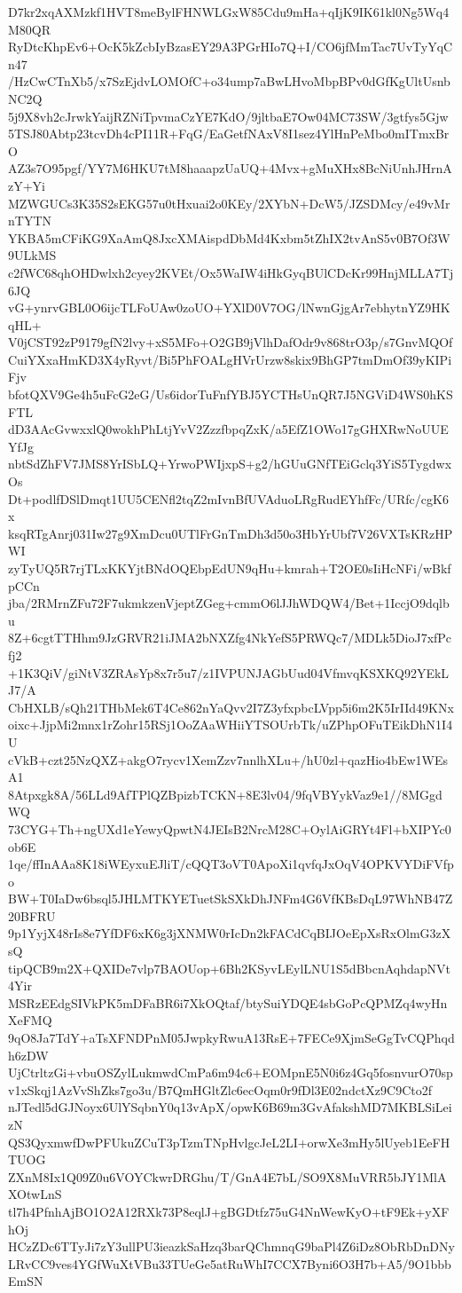 D7kr2xqAXMzkf1HVT8meBylFHNWLGxW85Cdu9mHa+qIjK9IK61kl0Ng5Wq4M80QR
RyDtcKhpEv6+OcK5kZcbIyBzasEY29A3PGrHIo7Q+I/CO6jfMmTac7UvTyYqCn47
/HzCwCTnXb5/x7SzEjdvLOMOfC+o34ump7aBwLHvoMbpBPv0dGfKgUltUsnbNC2Q
5j9X8vh2cJrwkYaijRZNiTpvmaCzYE7KdO/9jltbaE7Ow04MC73SW/3gtfys5Gjw
5TSJ80Abtp23tcvDh4cPI11R+FqG/EaGetfNAxV8I1sez4YlHnPeMbo0mITmxBrO
AZ3s7O95pgf/YY7M6HKU7tM8haaapzUaUQ+4Mvx+gMuXHx8BcNiUnhJHrnAzY+Yi
MZWGUCs3K35S2sEKG57u0tHxuai2o0KEy/2XYbN+DcW5/JZSDMcy/e49vMrnTYTN
YKBA5mCFiKG9XaAmQ8JxcXMAispdDbMd4Kxbm5tZhIX2tvAnS5v0B7Of3W9ULkMS
c2fWC68qhOHDwlxh2cyey2KVEt/Ox5WaIW4iHkGyqBUlCDcKr99HnjMLLA7Tj6JQ
vG+ynrvGBL0O6ijcTLFoUAw0zoUO+YXlD0V7OG/lNwnGjgAr7ebhytnYZ9HKqHL+
V0jCST92zP9179gfN2lvy+xS5MFo+O2GB9jVlhDafOdr9v868trO3p/s7GnvMQOf
CuiYXxaHmKD3X4yRyvt/Bi5PhFOALgHVrUrzw8skix9BhGP7tmDmOf39yKIPiFjv
bfotQXV9Ge4h5uFcG2eG/Us6idorTuFnfYBJ5YCTHsUnQR7J5NGViD4WS0hKSFTL
dD3AAcGvwxxlQ0wokhPhLtjYvV2ZzzfbpqZxK/a5EfZ1OWo17gGHXRwNoUUEYfJg
nbtSdZhFV7JMS8YrISbLQ+YrwoPWIjxpS+g2/hGUuGNfTEiGclq3YiS5TygdwxOs
Dt+podlfDSlDmqt1UU5CENfl2tqZ2mIvnBfUVAduoLRgRudEYhfFc/URfc/cgK6x
ksqRTgAnrj031Iw27g9XmDcu0UTlFrGnTmDh3d50o3HbYrUbf7V26VXTsKRzHPWI
zyTyUQ5R7rjTLxKKYjtBNdOQEbpEdUN9qHu+kmrah+T2OE0sIiHcNFi/wBkfpCCn
jba/2RMrnZFu72F7ukmkzenVjeptZGeg+cmmO6lJJhWDQW4/Bet+1IccjO9dqlbu
8Z+6cgtTTHhm9JzGRVR21iJMA2bNXZfg4NkYefS5PRWQc7/MDLk5DioJ7xfPcfj2
+1K3QiV/giNtV3ZRAsYp8x7r5u7/z1IVPUNJAGbUud04VfmvqKSXKQ92YEkLJ7/A
CbHXLB/sQh21THbMek6T4Ce862nYaQvv2I7Z3yfxpbcLVpp5i6m2K5IrIId49KNx
oixc+JjpMi2mnx1rZohr15RSj1OoZAaWHiiYTSOUrbTk/uZPhpOFuTEikDhN1I4U
cVkB+czt25NzQXZ+akgO7rycv1XemZzv7nnlhXLu+/hU0zl+qazHio4bEw1WEsA1
8Atpxgk8A/56LLd9AfTPlQZBpizbTCKN+8E3lv04/9fqVBYykVaz9e1//8MGgdWQ
73CYG+Th+ngUXd1eYewyQpwtN4JEIsB2NrcM28C+OylAiGRYt4Fl+bXIPYc0ob6E
1qe/ffInAAa8K18iWEyxuEJliT/cQQT3oVT0ApoXi1qvfqJxOqV4OPKVYDiFVfpo
BW+T0IaDw6bsql5JHLMTKYETuetSkSXkDhJNFm4G6VfKBsDqL97WhNB47Z20BFRU
9p1YyjX48rIs8e7YfDF6xK6g3jXNMW0rIcDn2kFACdCqBIJOeEpXsRxOlmG3zXsQ
tipQCB9m2X+QXIDe7vlp7BAOUop+6Bh2KSyvLEylLNU1S5dBbcnAqhdapNVt4Yir
MSRzEEdgSIVkPK5mDFaBR6i7XkOQtaf/btySuiYDQE4sbGoPcQPMZq4wyHnXeFMQ
9qO8Ja7TdY+aTsXFNDPnM05JwpkyRwuA13RsE+7FECe9XjmSeGgTvCQPhqdh6zDW
UjCtrltzGi+vbuOSZylLukmwdCmPa6m94c6+EOMpnE5N0i6z4Gq5fosnvurO70sp
v1xSkqj1AzVvShZks7go3u/B7QmHGltZlc6ecOqm0r9fDl3E02ndctXz9C9Cto2f
nJTedl5dGJNoyx6UlYSqbnY0q13vApX/opwK6B69m3GvAfakshMD7MKBLSiLeizN
QS3QyxmwfDwPFUkuZCuT3pTzmTNpHvlgcJeL2LI+orwXe3mHy5lUyeb1EeFHTUOG
ZXnM8Ix1Q09Z0u6VOYCkwrDRGhu/T/GnA4E7bL/SO9X8MuVRR5bJY1MlAXOtwLnS
tl7h4PfnhAjBO1O2A12RXk73P8eqlJ+gBGDtfz75uG4NnWewKyO+tF9Ek+yXFhOj
HCzZDc6TTyJi7zY3ullPU3ieazkSaHzq3barQChmnqG9baPl4Z6iDz8ObRbDnDNy
LRvCC9ves4YGfWuXtVBu33TUeGe5atRuWhI7CCX7Byni6O3H7b+A5/9O1bbbEmSN

